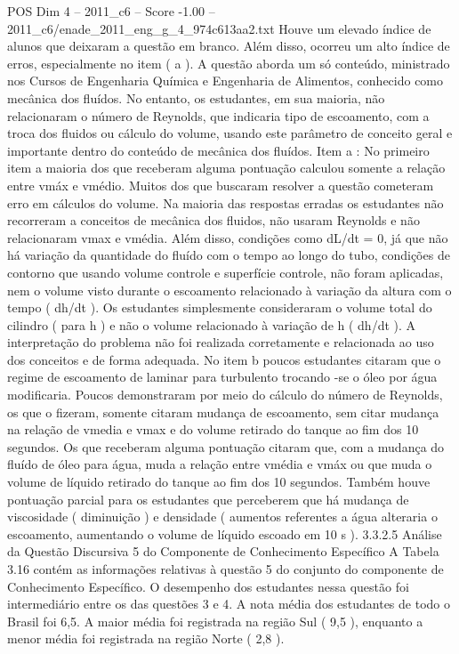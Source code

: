 \begin{textsample}{POS Dim 4 – 2011\_c6 – Score -1.00 – 2011\_c6/enade\_2011\_eng\_g\_4\_974c613aa2.txt}
Houve um elevado índice de alunos que deixaram a questão em branco.
Além disso, ocorreu um alto índice de erros, especialmente no item ( a ).
A questão aborda um só conteúdo, ministrado nos Cursos de Engenharia Química e Engenharia de Alimentos, conhecido como mecânica dos fluídos.
No entanto, os estudantes, em sua maioria, não relacionaram o número de Reynolds, que indicaria tipo de escoamento, com a troca dos fluidos ou cálculo do volume, usando este parâmetro de conceito geral e importante dentro do conteúdo de mecânica dos fluídos.
Item a : No primeiro item a maioria dos que receberam alguma pontuação calculou somente a relação entre vmáx e vmédio.
Muitos dos que buscaram resolver a questão cometeram erro em cálculos do volume.
Na maioria das respostas erradas os estudantes não recorreram a conceitos de mecânica dos fluidos, não usaram Reynolds e não relacionaram vmax e vmédia.
Além disso, condições como dL/dt = 0, já que não há variação da quantidade do fluído com o tempo ao longo do tubo, condições de contorno que usando volume controle e superfície controle, não foram aplicadas, nem o volume visto durante o escoamento relacionado à variação da altura com o tempo ( dh/dt ).
Os estudantes simplesmente consideraram o volume total do cilindro ( para h ) e não o volume relacionado à variação de h ( dh/dt ).
A interpretação do problema não foi realizada corretamente e relacionada ao uso dos conceitos e de forma adequada.
No item b poucos estudantes citaram que o regime de escoamento de laminar para turbulento trocando -se o óleo por água modificaria.
Poucos demonstraram por meio do cálculo do número de Reynolds, os que o fizeram, somente citaram mudança de escoamento, sem citar mudança na relação de vmedia e vmax e do volume retirado do tanque ao fim dos 10 segundos.
Os que receberam alguma pontuação citaram que, com a mudança do fluído de óleo para água, muda a relação entre vmédia e vmáx ou que muda o volume de líquido retirado do tanque ao fim dos 10 segundos.
Também houve pontuação parcial para os estudantes que perceberem que há mudança de viscosidade ( diminuição ) e densidade ( aumentos referentes a água alteraria o escoamento, aumentando o volume de líquido escoado em 10 s ). 3.3.2.5 Análise da Questão Discursiva 5 do Componente de Conhecimento Específico A Tabela 3.16 contém as informações relativas à questão 5 do conjunto do componente de Conhecimento Específico.
O desempenho dos estudantes nessa questão foi intermediário entre os das questões 3 e 4.
A nota média dos estudantes de todo o Brasil foi 6,5.
A maior média foi registrada na região Sul ( 9,5 ), enquanto a menor média foi registrada na região Norte ( 2,8 ).

\end{textsample}
